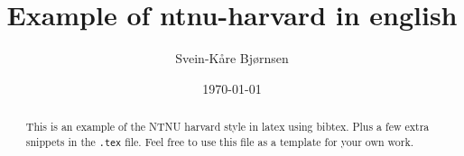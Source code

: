 \documentclass[norsk, a4paper, 11pt]{article}
\title{Example of ntnu-harvard in english}
\author{Svein-Kåre Bjørnsen}
\date{\today}
\newcommand{\code}[1]{{\small \texttt{#1}}}  %
\begin{document}
\maketitle

\begin{abstract}
This is an example of the NTNU harvard style in latex using bibtex.
Plus a few extra snippets in the \code{.tex} file. Feel free to use this file as a
template for your own work.
\end{abstract}




\end{document}
